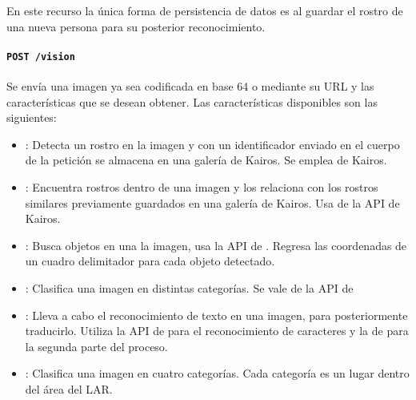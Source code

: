 En este recurso la única forma de persistencia de datos es al guardar el
rostro de una nueva persona para su posterior reconocimiento.


\paragraph{\texttt{\large POST /vision}}
\label{\detokenize{chapter_two/desc_cloudnao:post-vision}}

Se envía una imagen ya sea codificada en base 64 o mediante su URL y
las características que se desean obtener. Las características disponibles
son las siguientes:

\begin{itemize}
    \item{}
    :
Detecta un rostro en la imagen y
con un identificador enviado en
el cuerpo de la petición se
almacena en una galería de
Kairos. Se emplea
de Kairos.
\item{}
:
Encuentra rostros dentro de una
imagen y los relaciona con los
rostros similares previamente
guardados en una galería de
Kairos. Usa
de la API de Kairos.
\item{}
:
Busca objetos en una la imagen,
usa la API de .
Regresa las coordenadas de un
cuadro delimitador para cada
objeto detectado.
\item{}
:
Clasifica una imagen en distintas
categorías. Se vale de la API de
\item{}
:
Lleva a cabo el reconocimiento de
texto en una imagen, para
posteriormente traducirlo.
Utiliza la API de 
para el reconocimiento de
caracteres y la de 
para la segunda parte del proceso.
\item{}
:
Clasifica una imagen en cuatro
categorías. Cada categoría es un
lugar dentro del área del LAR.

\end{itemize}


